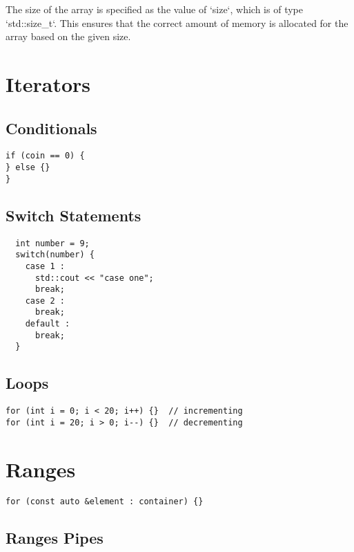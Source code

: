 The size of the array is specified as the value of `size`, which is of type `std::size\_t`. 
This ensures that the correct amount of memory is allocated for the array based on the given size.

\section{Iterators}
\subsection{Conditionals}

\begin{verbatim}
if (coin == 0) {
} else {}
}
\end{verbatim}

\subsection{Switch Statements}

\begin{verbatim}
  int number = 9;
  switch(number) {
    case 1 :
      std::cout << "case one";
      break;
    case 2 :
      break;
    default :
      break;
  }
\end{verbatim}

\subsection{Loops}

\begin{verbatim}
for (int i = 0; i < 20; i++) {}  // incrementing
for (int i = 20; i > 0; i--) {}  // decrementing
\end{verbatim}

\section{Ranges}

\begin{verbatim}
for (const auto &element : container) {}
\end{verbatim}

\subsection{Ranges Pipes}

